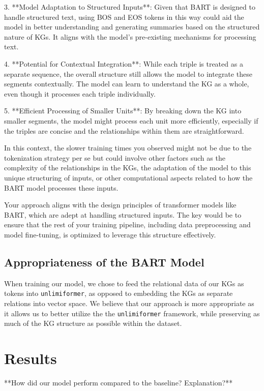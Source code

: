 \documentclass[12pt]{article}
\begin{document}
3. **Model Adaptation to Structured Inputs**: Given that BART is designed to handle structured text, using BOS and EOS tokens in this way could aid the model in better understanding and generating summaries based on the structured nature of KGs. It aligns with the model's pre-existing mechanisms for processing text.

4. **Potential for Contextual Integration**: While each triple is treated as a separate sequence, the overall structure still allows the model to integrate these segments contextually. The model can learn to understand the KG as a whole, even though it processes each triple individually.

5. **Efficient Processing of Smaller Units**: By breaking down the KG into smaller segments, the model might process each unit more efficiently, especially if the triples are concise and the relationships within them are straightforward.

In this context, the slower training times you observed might not be due to the tokenization strategy per se but could involve other factors such as the complexity of the relationships in the KGs, the adaptation of the model to this unique structuring of inputs, or other computational aspects related to how the BART model processes these inputs.

Your approach aligns with the design principles of transformer models like BART, which are adept at handling structured inputs. The key would be to ensure that the rest of your training pipeline, including data preprocessing and model fine-tuning, is optimized to leverage this structure effectively.

\subsection*{Appropriateness of the BART Model}
When training our model, we chose to feed the relational data of our KGs as tokens into \texttt{unlimiformer}, as opposed to embedding the KGs as separate relations into vector space. We believe that our approach is more appropriate as it allows us to better utilize the the \texttt{unlimiformer} framework, while preserving as much of the KG structure as possible within the dataset.

\section{Results}
**How did our model perform compared to the baseline? Explanation?**
\end{document}
